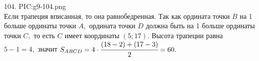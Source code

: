 104. {{PIC:g9-104.png}}\\
Если трапеция вписанная, то она равнобедренная. Так как ордината точки $B$ на 1 больше ординаты точки $A,$ ордината точки $D$ должна быть на 1 больше ординаты точки $C,$ то есть $C$ имеет координаты $(5;17).$ Высота трапеции равна $5-1=4,$ значит $S_{ABCD}=4\cdot\cfrac{(18-2)+(17-3)}{2}=60.$\\
